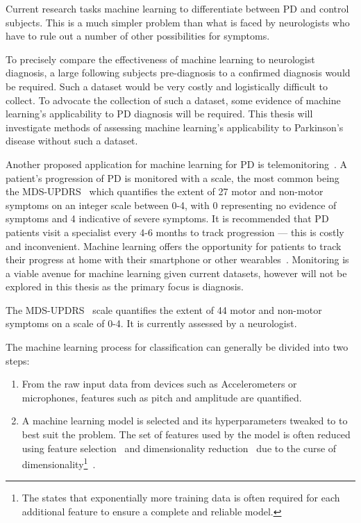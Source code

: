 \documentclass[12pt, twoside]{book}
\renewcommand\emph[1]{\textit{\color{USred}{#1}}}
\begin{document}
\begin{highlight}
Current research tasks machine learning to differentiate between PD and control subjects. This is a much simpler problem than what is faced by neurologists who have to rule out a number of other possibilities for symptoms.
\end{highlight}

To precisely compare the effectiveness of machine learning to neurologist diagnosis, a large \emph{longitudinal dataset} following subjects pre-diagnosis to a confirmed diagnosis would be required. Such a dataset would be very costly and logistically difficult to collect. To advocate the collection of such a dataset, some evidence of machine learning's applicability to PD diagnosis will be required. This thesis will investigate methods of assessing machine learning's applicability to Parkinson's disease without such a dataset.  

Another proposed application for machine learning for PD is telemonitoring~\cite{splittledysphonia2009, sptsanastelemonitor2010}. A patient's progression of PD is monitored with a scale, the most common being the MDS-UPDRS~\cite{updrs} which quantifies the extent of 27 motor and non-motor symptoms on an integer scale between 0-4, with 0 representing no evidence of symptoms and 4 indicative of severe symptoms. It is recommended that PD patients visit a specialist every 4-6 months to track progression --- this is costly and inconvenient. Machine learning offers the opportunity for patients to track their progress at home with their smartphone or other wearables~\cite{cancela2016monitoring}. Monitoring is a viable avenue for machine learning given current datasets, however will not be explored in this thesis as the primary focus is diagnosis.

\begin{highlight}[UPDRS]
The MDS-UPDRS~\cite{updrs} scale quantifies the extent of 44 motor and non-motor symptoms on a scale of 0-4. It is currently assessed by a neurologist.
\end{highlight}

The machine learning process for classification can generally be divided into two steps:
\begin{enumerate}[noitemsep, topsep=-10pt]
\item \emph{Feature engineering --- } From the raw input data from devices such as Accelerometers or microphones, features such as pitch and amplitude are quantified. 

\item \emph{Feature and Model selection -} A machine learning model is selected and its hyperparameters tweaked to to best suit the problem.  The set of features used by the model is often reduced using feature selection~\cite{featureselection} and dimensionality reduction~\cite{pca, ica} due to the curse of dimensionality\footnote{The \emph{curse of dimensionality} states that  exponentially more training data is often required for each additional feature to ensure a complete and reliable model.}~\cite{curseofdimensionality}. 
\end{enumerate}
\end{document}
